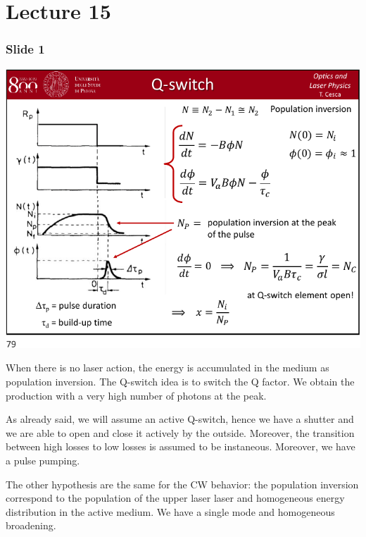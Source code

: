 \documentclass[../main/main.tex]{subfiles}
\begin{document}
\pagestyle{plain}

\section{Lecture 15}


\subsubsection*{Slide 1}

\begin{minipage}[]{0.5\linewidth}
\centering
\includegraphics[page=1,width=1\textwidth]{../lessons/pdf_file/15_lecture.pdf}
\end{minipage}
\hspace{0.3cm}\vspace{0.3cm}
\begin{minipage}[c]{0.47\linewidth}

When there is no laser action, the energy is accumulated in the medium as population inversion. The Q-switch idea is to switch the Q factor. We obtain the production with a very high number of photons at the peak.

As already said, we will assume an active Q-switch, hence we have a shutter and we are able to open and close it actively by the outside.
Moreover, the transition between high losses to low losses is assumed to be instaneous. Moreover, we have a pulse pumping.

The other hypothesis are the same for the CW behavior: the population inversion correspond to the population of the upper laser laser and homogeneous energy distribution in the active medium. We have a single mode and homogeneous broadening.

\end{minipage}
\end{document}
